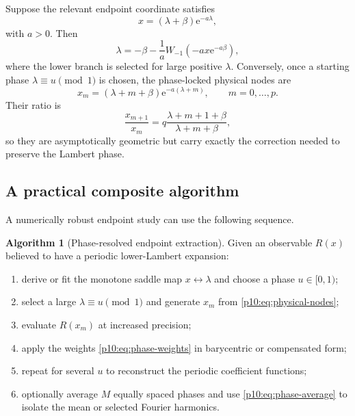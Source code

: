 \documentclass[11pt]{article}
\numberwithin{equation}{section}
\theoremstyle{definition}
\newtheorem{algorithm}[theorem]{Algorithm}
\theoremstyle{remark}
\newcommand{\e}{\mathrm e}
\begin{document}
Suppose the relevant endpoint coordinate satisfies
\begin{equation}
 x=(\lambda+\beta)\e^{-a\lambda},                            \label{p10:eq:lambert-node-equation}
\end{equation}
with $a>0$.  Then
\begin{equation}
 \boxed{\displaystyle
 \lambda=-\beta-\frac1a
 W_{-1}\!\left(-ax\e^{-a\beta}\right),}                    \label{p10:eq:lambert-node-inverse}
\end{equation}
where the lower branch is selected for large positive $\lambda$.  Conversely, once a starting
phase $\lambda\equiv u\pmod1$ is chosen, the phase-locked physical nodes are
\begin{equation}
 x_m=(\lambda+m+\beta)\e^{-a(\lambda+m)},
 \qquad m=0,\ldots,p.                                       \label{p10:eq:physical-nodes}
\end{equation}
Their ratio is
\begin{equation}
 \frac{x_{m+1}}{x_m}
 =q\frac{\lambda+m+1+\beta}{\lambda+m+\beta},               \label{p10:eq:node-ratio}
\end{equation}
so they are asymptotically geometric but carry exactly the correction needed to preserve the
Lambert phase.

\subsection{A practical composite algorithm}

A numerically robust endpoint study can use the following sequence.

\begin{algorithm}[Phase-resolved endpoint extraction]
\label{p10:alg:phase}
Given an observable $R(x)$ believed to have a periodic lower-Lambert expansion:
\begin{enumerate}
\item derive or fit the monotone saddle map $x\leftrightarrow\lambda$ and choose a phase
      $u\in[0,1)$;
\item select a large $\lambda\equiv u\pmod1$ and generate $x_m$ from
      \eqref{p10:eq:physical-nodes};
\item evaluate $R(x_m)$ at increased precision;
\item apply the weights \eqref{p10:eq:phase-weights} in barycentric or compensated form;
\item repeat for several $u$ to reconstruct the periodic coefficient functions;
\item optionally average $M$ equally spaced phases and use \eqref{p10:eq:phase-average} to isolate
      the mean or selected Fourier harmonics.
\end{enumerate}
\end{algorithm}
\end{document}
